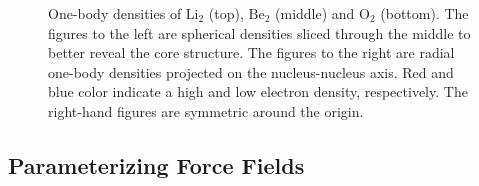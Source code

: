 \begin{figure}[h]
\begin{center}
  \caption{One-body densities of $\mathrm{Li_2}$ (top), $\mathrm{Be_2}$ (middle) and $\mathrm{O_2}$ (bottom). The figures to the left are spherical densities sliced through the middle to better reveal the core structure. The figures to the right are radial one-body densities projected on the nucleus-nucleus axis. Red and blue color indicate a high and low electron density, respectively. The right-hand figures are symmetric around the origin.}
  \label{fig:OBD_Molecules}
 \end{center}
\end{figure}
\renewcommand\floatpagefraction{.7}

\clearpage
\subsection{Parameterizing Force Fields}

